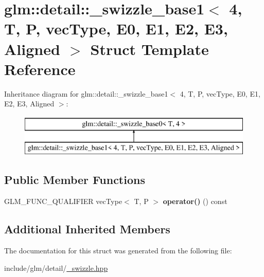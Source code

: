 \hypertarget{structglm_1_1detail_1_1__swizzle__base1_3_014_00_01T_00_01P_00_01vecType_00_01E0_00_01E1_00_01E2_00_01E3_00_01Aligned_01_4}{}\section{glm\+:\+:detail\+:\+:\+\_\+swizzle\+\_\+base1$<$ 4, T, P, vec\+Type, E0, E1, E2, E3, Aligned $>$ Struct Template Reference}
\label{structglm_1_1detail_1_1__swizzle__base1_3_014_00_01T_00_01P_00_01vecType_00_01E0_00_01E1_00_01E2_00_01E3_00_01Aligned_01_4}
Inheritance diagram for glm\+:\+:detail\+:\+:\+\_\+swizzle\+\_\+base1$<$ 4, T, P, vec\+Type, E0, E1, E2, E3, Aligned $>$\+:\begin{figure}[H]
\begin{center}
\leavevmode
\includegraphics[height=2.000000cm]{structglm_1_1detail_1_1__swizzle__base1_3_014_00_01T_00_01P_00_01vecType_00_01E0_00_01E1_00_01E2_00_01E3_00_01Aligned_01_4}
\end{center}
\end{figure}
\subsection*{Public Member Functions}
\begin{DoxyCompactItemize}
\item 
\mbox{\label{structglm_1_1detail_1_1__swizzle__base1_3_014_00_01T_00_01P_00_01vecType_00_01E0_00_01E1_00_01E2_00_01E3_00_01Aligned_01_4_a497e2bc364ab338474943fc655f69f1e}} 
G\+L\+M\+\_\+\+F\+U\+N\+C\+\_\+\+Q\+U\+A\+L\+I\+F\+I\+ER vec\+Type$<$ T, P $>$ {\bfseries operator()} () const
\end{DoxyCompactItemize}
\subsection*{Additional Inherited Members}


The documentation for this struct was generated from the following file\+:\begin{DoxyCompactItemize}
\item 
include/glm/detail/\hyperlink{__swizzle_8hpp}{\+\_\+swizzle.\+hpp}\end{DoxyCompactItemize}
